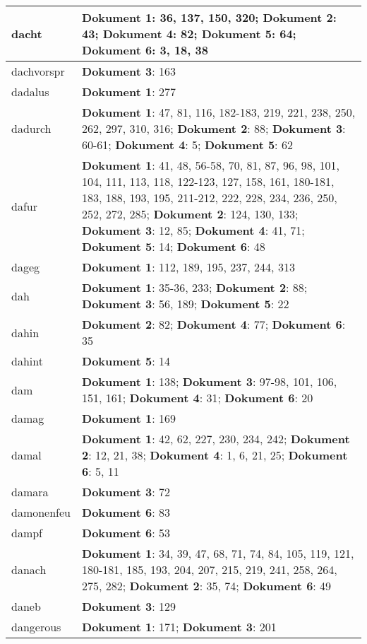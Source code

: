 \documentclass[a5paper]{article}
\begin{document}
\begin{longtable}[l]{|l|p{3in}|}
\hline
dacht & \textbf{Dokument 1}: 36, 137, 150, 320; \textbf{Dokument 2}: 43; \textbf{Dokument 4}: 82; \textbf{Dokument 5}: 64; \textbf{Dokument 6}: 3, 18, 38 \\
\hline
dachvorspr & \textbf{Dokument 3}: 163 \\
\hline
dadalus & \textbf{Dokument 1}: 277 \\
\hline
dadurch & \textbf{Dokument 1}: 47, 81, 116, 182-183, 219, 221, 238, 250, 262, 297, 310, 316; \textbf{Dokument 2}: 88; \textbf{Dokument 3}: 60-61; \textbf{Dokument 4}: 5; \textbf{Dokument 5}: 62 \\
\hline
dafur & \textbf{Dokument 1}: 41, 48, 56-58, 70, 81, 87, 96, 98, 101, 104, 111, 113, 118, 122-123, 127, 158, 161, 180-181, 183, 188, 193, 195, 211-212, 222, 228, 234, 236, 250, 252, 272, 285; \textbf{Dokument 2}: 124, 130, 133; \textbf{Dokument 3}: 12, 85; \textbf{Dokument 4}: 41, 71; \textbf{Dokument 5}: 14; \textbf{Dokument 6}: 48 \\
\hline
dageg & \textbf{Dokument 1}: 112, 189, 195, 237, 244, 313 \\
\hline
dah & \textbf{Dokument 1}: 35-36, 233; \textbf{Dokument 2}: 88; \textbf{Dokument 3}: 56, 189; \textbf{Dokument 5}: 22 \\
\hline
dahin & \textbf{Dokument 2}: 82; \textbf{Dokument 4}: 77; \textbf{Dokument 6}: 35 \\
\hline
dahint & \textbf{Dokument 5}: 14 \\
\hline
dam & \textbf{Dokument 1}: 138; \textbf{Dokument 3}: 97-98, 101, 106, 151, 161; \textbf{Dokument 4}: 31; \textbf{Dokument 6}: 20 \\
\hline
damag & \textbf{Dokument 1}: 169 \\
\hline
damal & \textbf{Dokument 1}: 42, 62, 227, 230, 234, 242; \textbf{Dokument 2}: 12, 21, 38; \textbf{Dokument 4}: 1, 6, 21, 25; \textbf{Dokument 6}: 5, 11 \\
\hline
damara & \textbf{Dokument 3}: 72 \\
\hline
damonenfeu & \textbf{Dokument 6}: 83 \\
\hline
dampf & \textbf{Dokument 6}: 53 \\
\hline
danach & \textbf{Dokument 1}: 34, 39, 47, 68, 71, 74, 84, 105, 119, 121, 180-181, 185, 193, 204, 207, 215, 219, 241, 258, 264, 275, 282; \textbf{Dokument 2}: 35, 74; \textbf{Dokument 6}: 49 \\
\hline
daneb & \textbf{Dokument 3}: 129 \\
\hline
dangerous & \textbf{Dokument 1}: 171; \textbf{Dokument 3}: 201 \\

\end{longtable}
\end{document}

